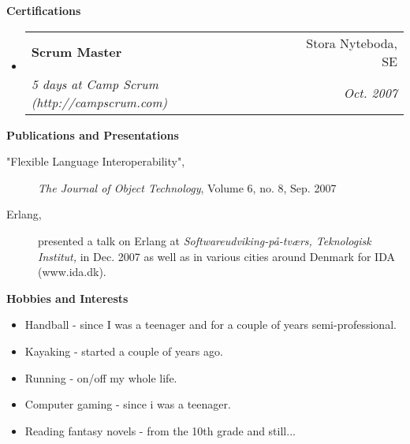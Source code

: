 \documentclass[a4paper,11pt]{article}
\makeatletter
\newcommand{\resheading}[1]{{\vspace{5mm}\Large
    \colorbox{mygrey}{\begin{minipage}{\textwidth}{\textbf{#1
            \vphantom{p\^{E}}}}\end{minipage}}}}
\newcommand{\ressubheading}[4]{
\begin{tabular*}{172mm}{l@{\extracolsep{\fill}}r}
		\textbf{#1} & #2 \\
		\textit{#3} & \textit{#4} \\
\end{tabular*}\vspace{-6pt}}
\makeatother
\begin{document}
\resheading{Certifications}
\begin{itemize}
\item
	\ressubheading{Scrum Master}{Stora Nyteboda, SE}{5 days at Camp Scrum (http://campscrum.com)}{Oct. 2007}

\end{itemize}

\resheading{Publications and Presentations}
\begin{description}
\item["Flexible Language Interoperability",] \emph{The Journal of
  Object Technology}, Volume 6, no. 8, Sep. 2007

\item[Erlang,] presented a talk on Erlang at
  \emph{Softwareudviking-på-tværs, Teknologisk Institut,} in Dec. 2007
  as well as in various cities around Denmark for IDA (www.ida.dk).

\end{description}

\resheading{Hobbies and Interests}

\begin{itemize}
\item Handball - since I was a teenager and for a couple of years
  semi-professional.
\item Kayaking - started a couple of years ago.
\item Running - on/off my whole life.
\item Computer gaming - since i was a teenager.
\item Reading fantasy novels - from the 10th grade and still...
\end{itemize}
\end{document}
